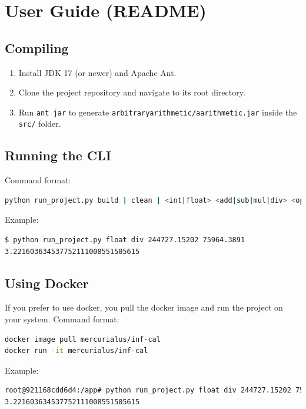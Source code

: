 \documentclass[12pt]{article}
\begin{document}
\section{User Guide (README)}
\subsection{Compiling}\label{sec:compile}
\begin{enumerate}
  \item Install JDK 17 (or newer) and Apache Ant.
  \item Clone the project repository and navigate to its root directory.
  \item Run \lstinline|ant jar| to generate \texttt{arbitraryarithmetic/aarithmetic.jar} inside the \texttt{src/} folder.
\end{enumerate}

\subsection{Running the CLI}
Command format:
\begin{lstlisting}[language=bash]
python run_project.py build | clean | <int|float> <add|sub|mul|div> <operand1> <operand2>
\end{lstlisting}

Example:
\begin{lstlisting}[language=bash]
$ python run_project.py float div 244727.15202 75964.3891
3.221603634537752111008551505615
\end{lstlisting}

\subsection{Using Docker}
If you prefer to use docker, you pull the docker image and run the project on your system.
Command format:
\begin{lstlisting}[language=bash]
docker image pull mercurialus/inf-cal
docker run -it mercurialus/inf-cal
\end{lstlisting}

Example:
\begin{lstlisting}[language=bash]
root@921168cdd6d4:/app# python run_project.py float div 244727.15202 75964.3891
3.221603634537752111008551505615
\end{lstlisting}
\end{document}
